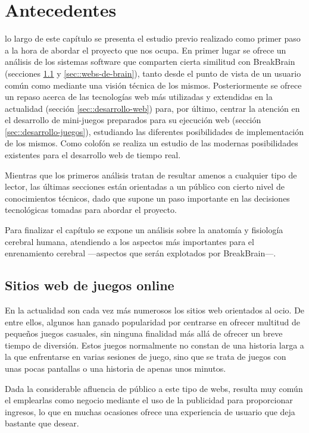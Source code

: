 \chapter{Antecedentes}
\label{chap:antecedentes}

 lo largo de este capítulo se presenta el estudio previo realizado como primer paso a la hora de abordar el proyecto que nos ocupa. En primer lugar se ofrece un análisis de los sistemas software que comparten cierta similitud con BreakBrain (secciones \ref{sec::webs-de-juegos} y \ref{sec::webs-de-brain}), tanto desde el punto de vista de un usuario común como mediante una visión técnica de los mismos. Posteriormente se ofrece un repaso acerca de las tecnologías web más utilizadas y extendidas en la actualidad (sección \ref{sec::desarrollo-web}) para, por último, centrar la atención en el desarrollo de mini-juegos preparados para su ejecución web (sección \ref{sec::desarrollo-juegos}), estudiando las diferentes posibilidades de implementación de los mismos. Como colofón se realiza un estudio de las modernas posibilidades existentes para el desarrollo web de tiempo real.

Mientras que los primeros análisis tratan de resultar amenos a cualquier tipo de lector, las últimas secciones están orientadas a un público con cierto nivel de conocimientos técnicos, dado que supone un paso importante en las decisiones tecnológicas tomadas para abordar el proyecto.

Para finalizar el capítulo se expone un análisis sobre la anatomía y fisiología cerebral humana, atendiendo a los aspectos más importantes para el enrenamiento cerebral ---aspectos que serán explotados por BreakBrain---.

\section{Sitios web de juegos online}
\label{sec::webs-de-juegos}

En la actualidad son cada vez más numerosos los sitios web orientados al ocio. De entre ellos, algunos han ganado popularidad por centrarse en ofrecer multitud de pequeños juegos casuales, sin ninguna finalidad más allá de ofrecer un breve tiempo de diversión. Estos juegos normalmente no constan de una historia larga a la que enfrentarse en varias sesiones de juego, sino que se trata de juegos con unas pocas pantallas o una historia de apenas unos minutos.

Dada la considerable afluencia de público a este tipo de webs, resulta muy común el emplearlas como negocio mediante el uso de la publicidad para proporcionar ingresos, lo que en muchas ocasiones ofrece una experiencia de usuario que deja bastante que desear.


